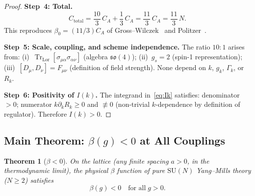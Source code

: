 \documentclass[12pt,a4paper]{article}
\theoremstyle{plain}
\newtheorem{theorem}{Theorem}[section]
\theoremstyle{definition}
\theoremstyle{remark}
\begin{document}
\begin{proof}
\textbf{Step~4: Total.}
\begin{equation}\label{eq:Ctotal}
C_{\mathrm{total}} = \frac{10}{3}\,C_A + \frac{1}{3}\,C_A = \frac{11}{3}\,C_A = \frac{11}{3}\,N.
\end{equation}
This reproduces $\beta_0=(11/3)C_A$ of Gross--Wilczek~\cite{GrossWilczek1973} and Politzer~\cite{Politzer1973}.

\textbf{Step~5: Scale, coupling, and scheme independence.} The ratio $10{:}1$ arises from: (i)~$\operatorname{Tr}_{\mathrm{Lor}}[\sigma_{\mu\alpha}\sigma_{\alpha\nu}]$ (algebra $\mathfrak{so}(4)$); (ii)~$g_s=2$ (spin-1 representation); (iii)~$[D_\mu,D_\nu]=F_{\mu\nu}$ (definition of field strength). None depend on $k$, $g_k$, $\Gamma_k$, or $R_k$.

\textbf{Step~6: Positivity of $I(k)$.} The integrand in~\eqref{eq:Ik} satisfies: denominator $>0$; numerator $k\partial_k R_k\geq 0$ and $\not\equiv 0$ (non-trivial $k$-dependence by definition of regulator). Therefore $I(k)>0$.
\end{proof}

\subsection{Main Theorem: $\beta(g)<0$ at All Couplings}\label{sec:mainbeta}

\begin{theorem}[$\beta<0$]\label{thm:beta}
On the lattice (any finite spacing $a>0$, in the thermodynamic limit), the physical $\beta$ function of pure $\mathrm{SU}(N)$ Yang--Mills theory ($N\geq 2$) satisfies
\begin{equation}\label{eq:betaneg}
\beta(g) < 0 \quad \text{for all}\;g>0.
\end{equation}
\end{theorem}
\end{document}
